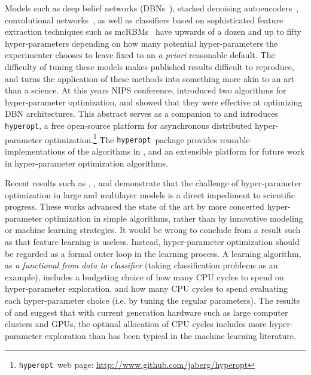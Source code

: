 \documentclass{article}
\renewcommand{\citet}{\cite}
\newcommand{\hyperopt}{{\tt hyperopt}}
\begin{document}
Models such as deep belief networks (DBNs~\citep{hinton+osindero+teh:2006}),
stacked denoising autoencoders~\citep{vincent+larochelle+lajoie+bengio+manzagol:2010},
convolutional networks~\citep{lecun+bottou+bengio+haffner:1998},
as well as classifiers based on sophisticated feature extraction techniques such as
mcRBMs~\citep{ranzato+hinton:2010}
have upwards of a dozen and up to fifty hyper-parameters depending on how many
potential hyper-parameters the experimenter chooses to leave fixed to an {\it a priori} reasonable default.
The difficulty of tuning these models makes published results difficult to
reproduce, and turns the application of these methods into something more akin
to an art than a science.
At this years NIPS conference, \citet{bergstra+bardenet+bengio+kegl:2011} introduced
two algorithms for hyper-parameter optimization, and showed that they were effective
at optimizing DBN architectures.
This abstract serves as a companion to \citet{bergstra+bardenet+bengio+kegl:2011}
and introduces \hyperopt, a free open-source platform for
asynchronous distributed hyper-parameter optimization.\footnote{
\hyperopt\ web page: \url{http://www.github.com/jaberg/hyperopt}}
The \hyperopt\ package provides reusable implementations of the algorithms in \citet{bergstra+bardenet+bengio+kegl:2011}, and an extensible platform for future work in hyper-parameter optimization algorithms.

Recent results such as
\citet{Pinto-2009}, \citet{coates+lee+ng:2010}, and \citet{coates+ng:2011}
demonstrate that the challenge of hyper-parameter optimization
in large and multilayer models is a direct impediment to scientific progress.
These works
advanced the state of the art
by more concerted hyper-parameter optimization in simple algorithms,
rather than by innovative modeling or machine learning strategies.
It would be wrong to conclude from a result such as \citet{Pinto-2009}
that feature learning is useless.
Instead, hyper-parameter optimization should be regarded as
a formal outer loop in the learning process.
A learning algorithm,
as {\em a functional from data to classifier} (taking classification problems as an example),
includes a budgeting choice of how many CPU cycles to spend on hyper-parameter exploration,
and how many CPU cycles to spend evaluating each hyper-parameter choice (i.e. by
tuning the regular parameters).
The results of \citet{Pinto-2009} and \citet{coates+ng:2011} suggest that
with current generation hardware such as large computer clusters and GPUs,
the optimal allocation of CPU cycles includes more hyper-parameter exploration
than has been typical in the machine learning literature.
\end{document}
